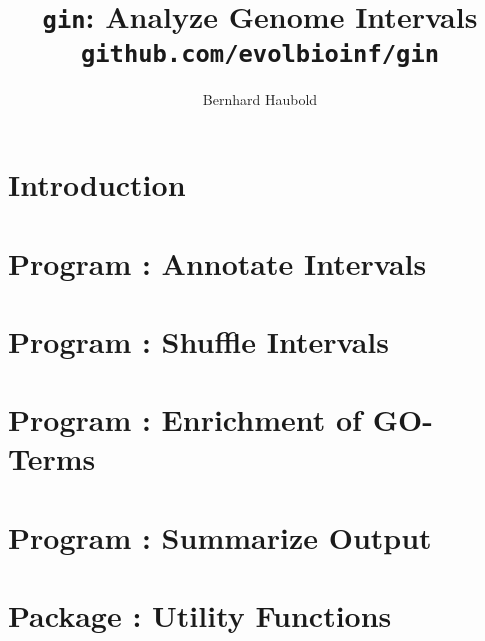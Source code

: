 \documentclass[a4paper]{report}
\begin{document}
\pagestyle{noweb}

\title{\texttt{gin}: Analyze Genome Intervals\\
\small\texttt{github.com/evolbioinf/gin}}
\author{Bernhard Haubold}
\maketitle
\tableofcontents

\chapter{Introduction}

\chapter{Program : Annotate Intervals}\label{ch:an}

\chapter{Program : Shuffle Intervals}\label{ch:sh}

\chapter{Program : Enrichment of GO-Terms}\label{ch:eg}

\chapter{Program : Summarize  Output}\label{ch:su}

\chapter{Package : Utility Functions}\label{ch:ut}


\end{document}
